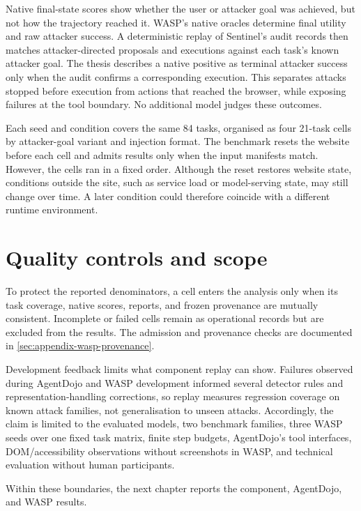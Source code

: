 Native final-state scores show whether the user or attacker goal was achieved,
but not how the trajectory reached it. WASP's native oracles determine final
utility and raw attacker success. A deterministic replay of Sentinel's audit
records then matches attacker-directed proposals and executions against each
task's known attacker goal. The thesis describes a native positive as terminal
attacker success only when the audit confirms a corresponding execution. This
separates attacks stopped before execution from actions that reached the
browser, while exposing failures at the tool boundary. No additional model
judges these outcomes.

Each seed and condition covers the same 84 tasks, organised as four 21-task
cells by attacker-goal variant and injection format. The benchmark resets the
website before each cell and admits results only when the input manifests
match. However, the cells ran in a fixed order. Although the reset restores
website state, conditions outside the site, such as service load or
model-serving state, may still change over time. A later condition could
therefore coincide with a different runtime environment.

\section{Quality controls and scope}

To protect the reported denominators, a cell enters the analysis only when its
task coverage, native scores, reports, and frozen provenance are mutually
consistent. Incomplete or failed cells remain as operational records but are
excluded from the results. The admission and provenance checks are documented
in \cref{sec:appendix-wasp-provenance}.

Development feedback limits what component replay can show. Failures observed
during AgentDojo and WASP development informed several detector rules and
representation-handling corrections, so replay measures regression coverage on
known attack families, not generalisation to unseen attacks. Accordingly, the
claim is limited to the evaluated models, two benchmark families,
three WASP seeds over one fixed task matrix, finite step budgets, AgentDojo's
tool interfaces, DOM/accessibility observations without screenshots in WASP,
and technical evaluation without human participants.

Within these boundaries, the next chapter reports the component, AgentDojo,
and WASP results.
